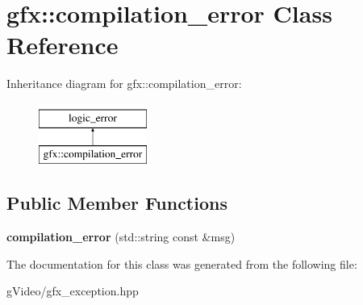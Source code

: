\hypertarget{classgfx_1_1compilation__error}{\section{gfx\-:\-:compilation\-\_\-error Class Reference}
\label{classgfx_1_1compilation__error}
}
Inheritance diagram for gfx\-:\-:compilation\-\_\-error\-:\begin{figure}[H]
\begin{center}
\leavevmode
\includegraphics[height=2.000000cm]{classgfx_1_1compilation__error}
\end{center}
\end{figure}
\subsection*{Public Member Functions}
\begin{DoxyCompactItemize}
\item 
\hypertarget{classgfx_1_1compilation__error_a6b7152978001a084063277f327710512}{{\bfseries compilation\-\_\-error} (std\-::string const \&msg)}\label{classgfx_1_1compilation__error_a6b7152978001a084063277f327710512}

\end{DoxyCompactItemize}


The documentation for this class was generated from the following file\-:\begin{DoxyCompactItemize}
\item 
g\-Video/gfx\-\_\-exception.\-hpp\end{DoxyCompactItemize}
